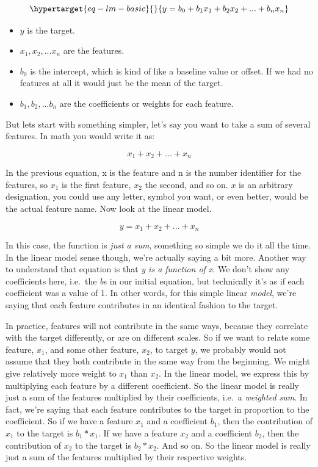 \documentclass[
  letterpaper,
]{krantz}
\providecommand{\tightlist}{%
  \setlength{\itemsep}{0pt}\setlength{\parskip}{0pt}}\usepackage{longtable,booktabs,array}
\begin{document}
\begin{equation}\protect\hypertarget{eq-lm-basic}{}{
y = b_0 + b_1x_1 + b_2x_2 + ... + b_nx_n
}\label{eq-lm-basic}\end{equation}

\begin{itemize}
\tightlist
\item
  \(y\) is the target.
\item
  \(x_1, x_2, ... x_n\) are the features.
\item
  \(b_0\) is the intercept, which is kind of like a baseline value or
  offset. If we had no features at all it would just be the mean of the
  target.
\item
  \(b_1, b_2, ... b_n\) are the coefficients or weights for each
  feature.
\end{itemize}

But lets start with something simpler, let's say you want to take a sum
of several features. In math you would write it as:

\[
x_1 + x_2 + ... + x_n
\]

In the previous equation, x is the feature and n is the number
identifier for the features, so \(x_1\) is the first feature, \(x_2\)
the second, and so on. \(x\) is an arbitrary designation, you could use
any letter, symbol you want, or even better, would be the actual feature
name. Now look at the linear model.

\[
y = x_1 + x_2 + ... + x_n
\]

In this case, the function is \emph{just a sum}, something so simple we
do it all the time. In the linear model sense though, we're actually
saying a bit more. Another way to understand that equation is that
\emph{y is a function of x}. We don't show any coefficients here,
i.e.~the \emph{b}s in our initial equation, but technically it's as if
each coefficient was a value of 1. In other words, for this simple
linear \emph{model}, we're saying that each feature contributes in an
identical fashion to the target.

In practice, features will not contribute in the same ways, because they
correlate with the target differently, or are on different scales. So if
we want to relate some feature, \(x_1\), and some other feature,
\(x_2\), to target \(y\), we probably would not assume that they both
contribute in the same way from the beginning. We might give relatively
more weight to \(x_1\) than \(x_2\). In the linear model, we express
this by multiplying each feature by a different coefficient. So the
linear model is really just a sum of the features multiplied by their
coefficients, i.e.~a \emph{weighted sum}. In fact, we're saying that
each feature contributes to the target in proportion to the coefficient.
So if we have a feature \(x_1\) and a coefficient \(b_1\), then the
contribution of \(x_1\) to the target is \(b_1*x_1\). If we have a
feature \(x_2\) and a coefficient \(b_2\), then the contribution of
\(x_2\) to the target is \(b_2 * x_2\). And so on. So the linear model
is really just a sum of the features multiplied by their respective
weights.
\end{document}
